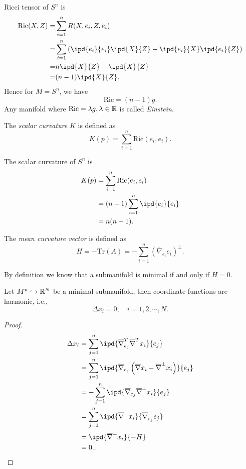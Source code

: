 Ricci tensor of $S^n$ is
  \begin{align*}
    \mathrm{Ric}(X,Z)=&\sum_{i=1}^{n} R(X,e_i,Z,e_i)\\
    =& \sum_{i=1}^{n} \left( \ipd{e_i}{e_i}\ipd{X}{Z}-\ipd{e_i}{X}\ipd{e_i}{Z} \right) \\
    =& n\ipd{X}{Z}-\ipd{X}{Z}\\
    =& (n-1)\ipd{X}{Z}
  .\end{align*}
  Hence for $M=S^n$, we have 
  \[
    \mathrm{Ric}=(n-1)g.
  \] 
Any manifold where $\mathrm{Ric}=\lambda g,\lambda\in \mathbb{R}$ is called \textit{Einstein}.
\begin{definition}
  The \textit{scalar curvature} $K$ is defined as
  \begin{equation}
    K(p)=\sum_{i=1}^{n} \mathrm{Ric}\left( e_i,e_i \right). 
  \end{equation}
\end{definition}

The scalar curvature of $S^n$ is
\begin{align*}
  K(p)&=\sum_{i=1}^{n} \mathrm{Ric}(e_i,e_i)\\
  &=(n-1)\sum_{i=1}^{n} \ipd{e_i}{e_i}\\
  &=n(n-1)
.\end{align*}

\begin{definition}
  The \textit{mean curvature vector} is defined as
  \begin{equation}
    H=-\mathrm{Tr}(A)=-\sum_{i=1}^{n} \left( \overline{\nabla }_{e_i}e_i \right) ^{\perp}.
  \end{equation}
\end{definition}

By definition we know that a submanifold is minimal if and only if $H=0$.

 \begin{theorem}
  Let $M^n\hookrightarrow \mathbb{R}^{N}$ be a minimal submanifold, then coordinate functions are harmonic, i.e., 
  \[
  \Delta x_i=0,\quad i=1,2,\cdots ,N.
  \] 
\end{theorem}
\begin{proof}
  \begin{align*}
    \Delta x_i &= \sum_{j=1}^{n} \ipd{\overline{\nabla }_{e_j}^T \overline{\nabla }^T x_i}{e_j}\\
    &=\sum_{j=1}^{n}  \ipd{\overline{\nabla }_{e_j}\left( \overline{\nabla }x_i-\overline{\nabla }^\perp x_i \right) }{e_j}\\
    &=-\sum_{j=1}^{n} \ipd{\overline{\nabla }_{e_j}\overline{\nabla }^\perp x_i}{e_j}\\
    &=\sum_{j=1}^{n}  \ipd{\overline{\nabla }^{\perp}x_i}{\overline{\nabla }_{e_j}^{\perp}e_j}\\
    &= \ipd{\overline{\nabla }^{\perp}x_i}{-H}\\
    &=0.
  .\end{align*}
\end{proof}

